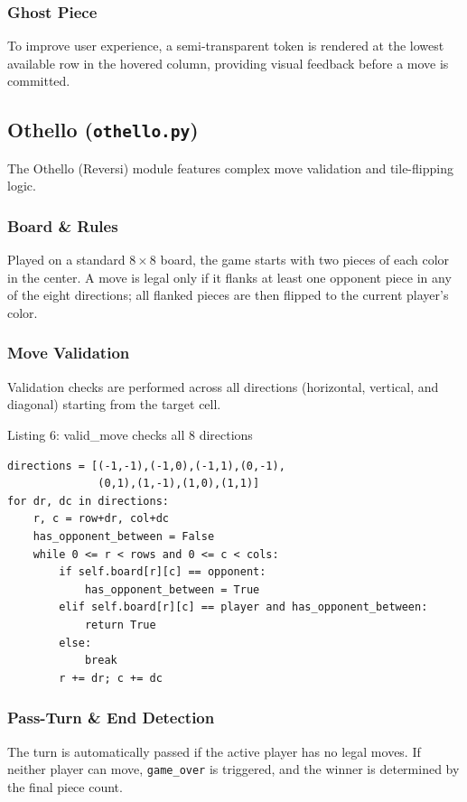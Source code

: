 \documentclass[12pt]{article}
\begin{document}
\subsubsection*{Ghost Piece}
To improve user experience, a semi-transparent token is rendered at the lowest available row in the hovered column, providing visual feedback before a move is committed.

\subsection{Othello (\texttt{othello.py})}
The Othello (Reversi) module features complex move validation and tile-flipping logic.

\subsubsection*{Board \& Rules}
Played on a standard $8 \times 8$ board, the game starts with two pieces of each color in the center. A move is legal only if it flanks at least one opponent piece in any of the eight directions; all flanked pieces are then flipped to the current player's color.

\subsubsection*{Move Validation}
Validation checks are performed across all directions (horizontal, vertical, and diagonal) starting from the target cell.

\begin{center}
Listing 6: valid\_move checks all 8 directions
\end{center}
\begin{lstlisting}[style=pythonstyle]
directions = [(-1,-1),(-1,0),(-1,1),(0,-1),
              (0,1),(1,-1),(1,0),(1,1)]
for dr, dc in directions:
    r, c = row+dr, col+dc
    has_opponent_between = False
    while 0 <= r < rows and 0 <= c < cols:
        if self.board[r][c] == opponent:
            has_opponent_between = True
        elif self.board[r][c] == player and has_opponent_between:
            return True
        else:
            break
        r += dr; c += dc
\end{lstlisting}

\subsubsection*{Pass-Turn \& End Detection}
The turn is automatically passed if the active player has no legal moves. If neither player can move, \texttt{game\_over} is triggered, and the winner is determined by the final piece count.
\end{document}
